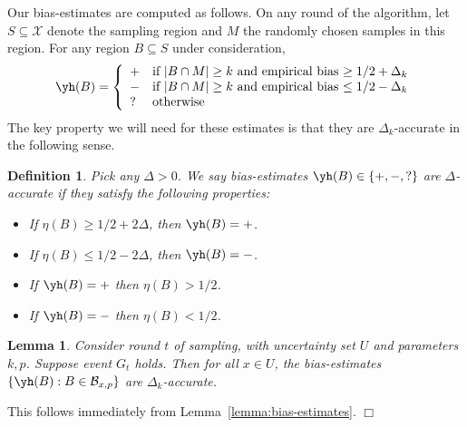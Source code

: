 \documentclass{article}
\def\X{{\mathcal X}}
\def\B{{\mathcal B}}
\newtheorem{lemma}[thm]{Lemma}
\newtheorem{defn}[thm]{Definition}
\newenvironment{proof}{\noindent {\sc Proof:}}{$\Box$ \medskip}
\begin{document}
Our bias-estimates are computed as follows. On any round of the algorithm, let $S \subseteq \X$ denote the sampling region and $M$ the randomly chosen samples in this region. For any region $B \subseteq S$ under consideration, 
$$ \yh(B) = 
\left\{
\begin{array}{ll}
+ & \mbox{if $|B \cap M| \geq k$ and empirical bias $\geq 1/2 + \Delta_k$} \\
- & \mbox{if $|B \cap M| \geq k$ and empirical bias $\leq 1/2 - \Delta_k$} \\
? & \mbox{otherwise}
\end{array}
\right.
$$
The key property we will need for these estimates is that they are $\Delta_k$-accurate in the following sense.
\begin{defn}
Pick any $\Delta > 0$. We say bias-estimates $\yh(B) \in \{+,-,?\}$ are $\Delta$-accurate if they satisfy the following properties:
\begin{itemize}
\item If $\eta(B) \geq 1/2 + 2\Delta$, then $\yh(B) = +$.
\item If $\eta(B) \leq 1/2 - 2\Delta$, then $\yh(B) = -$.
\item If $\yh(B) = +$ then $\eta(B) > 1/2$.
\item If $\yh(B) = -$ then $\eta(B) < 1/2$.
\end{itemize}
\label{defn:delta-accurate}
\end{defn}

\begin{lemma}
Consider round $t$ of sampling, with uncertainty set $U$ and parameters $k,p$. Suppose event $G_t$ holds. Then for all $x \in U$, the bias-estimates $\{\yh(B): B \in \B_{x,p}\}$ are $\Delta_k$-accurate.
\label{lemma:accurate-bias}
\end{lemma}
\begin{proof}
This follows immediately from Lemma~\ref{lemma:bias-estimates}.
\end{proof}
\end{document}
